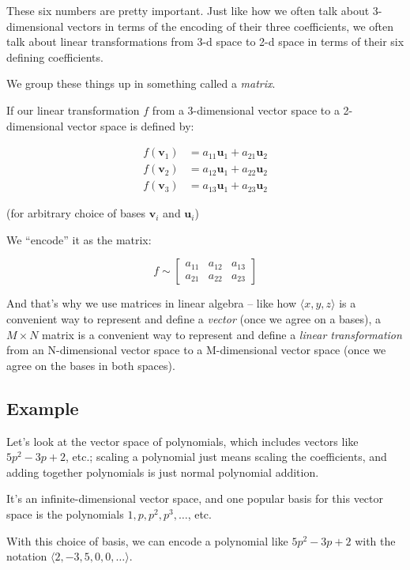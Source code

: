 \documentclass[]{article}
\begin{document}
These six numbers are pretty important. Just like how we often talk about
3-dimensional vectors in terms of the encoding of their three coefficients, we
often talk about linear transformations from 3-d space to 2-d space in terms of
their six defining coefficients.

We group these things up in something called a \emph{matrix}.

If our linear transformation \(f\) from a 3-dimensional vector space to a
2-dimensional vector space is defined by:

\[
\begin{aligned}
f(\mathbf{v}_1) & = a_{11} \mathbf{u}_1 + a_{21} \mathbf{u}_2 \\
f(\mathbf{v}_2) & = a_{12} \mathbf{u}_1 + a_{22} \mathbf{u}_2 \\
f(\mathbf{v}_3) & = a_{13} \mathbf{u}_1 + a_{23} \mathbf{u}_2
\end{aligned}
\]

(for arbitrary choice of bases \(\mathbf{v}_i\) and \(\mathbf{u}_i\))

We ``encode'' it as the matrix:

\[
f
\sim
\begin{bmatrix}
a_{11} & a_{12} & a_{13} \\
a_{21} & a_{22} & a_{23}
\end{bmatrix}
\]

And that's why we use matrices in linear algebra -- like how \(\langle x, y, z
\rangle\) is a convenient way to represent and define a \emph{vector} (once we
agree on a bases), a \(M \times N\) matrix is a convenient way to represent and
define a \emph{linear transformation} from an N-dimensional vector space to a
M-dimensional vector space (once we agree on the bases in both spaces).

\subsection{Example}\label{example}

Let's look at the vector space of polynomials, which includes vectors like \(5
p^2 - 3 p + 2\), etc.; scaling a polynomial just means scaling the coefficients,
and adding together polynomials is just normal polynomial addition.

It's an infinite-dimensional vector space, and one popular basis for this vector
space is the polynomials \(1, p, p^2, p^3, \ldots\), etc.

With this choice of basis, we can encode a polynomial like \(5 p^2 - 3 p + 2\)
with the notation \(\langle 2, -3, 5, 0, 0, \ldots \rangle\).
\end{document}
